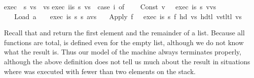 \begin{isabellebody}
\isanewline
{\isachardoublequote}exec\ {\isacharbrackleft}{\isacharbrackright}\ s\ vs\ {\isacharequal}\ vs{\isachardoublequote}\isanewline
{\isachardoublequote}exec\ {\isacharparenleft}i{\isacharhash}is{\isacharparenright}\ s\ vs\ {\isacharequal}\ {\isacharparenleft}case\ i\ of\isanewline
\ \ \ \ Const\ v\ \ {\isasymRightarrow}\ exec\ is\ s\ {\isacharparenleft}v{\isacharhash}vs{\isacharparenright}\isanewline
\ \ {\isacharbar}\ Load\ a\ \ \ {\isasymRightarrow}\ exec\ is\ s\ {\isacharparenleft}{\isacharparenleft}s\ a{\isacharparenright}{\isacharhash}vs{\isacharparenright}\isanewline
\ \ {\isacharbar}\ Apply\ f\ \ {\isasymRightarrow}\ exec\ is\ s\ {\isacharparenleft}{\isacharparenleft}f\ {\isacharparenleft}hd\ vs{\isacharparenright}\ {\isacharparenleft}hd{\isacharparenleft}tl\ vs{\isacharparenright}{\isacharparenright}{\isacharparenright}{\isacharhash}{\isacharparenleft}tl{\isacharparenleft}tl\ vs{\isacharparenright}{\isacharparenright}{\isacharparenright}{\isacharparenright}{\isachardoublequote}%
\begin{isamarkuptext}%
\noindent
Recall that  and 
return the first element and the remainder of a list.
Because all functions are total,  is defined even for the empty
list, although we do not know what the result is. Thus our model of the
machine always terminates properly, although the above definition does not
tell us much about the result in situations where  was executed
with fewer than two elements on the stack.


\end{isamarkuptext}
\end{isabellebody}
